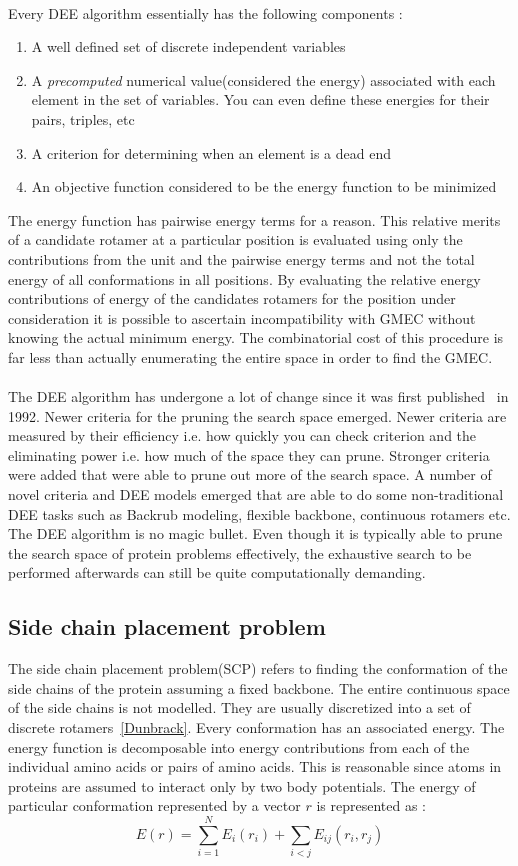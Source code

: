\documentclass{article}
\begin{document}
\\
Every DEE algorithm essentially has the following components :
\begin{enumerate}
\item A well defined set of discrete independent variables
\item A \emph{precomputed} numerical value(considered the energy) associated with each element in the set of variables. You can even define these energies for their pairs, triples, etc
\item A criterion for determining when an element is a dead end
\item An objective function considered to be the energy function to be minimized
\end{enumerate}

The energy function has pairwise energy terms for a reason. This relative merits of a candidate rotamer at a particular position is evaluated using only the contributions from the unit and the pairwise energy terms and not the total energy of all conformations in all positions. By evaluating the relative energy contributions of energy of the candidates rotamers for the position under consideration it is possible to ascertain incompatibility with GMEC without knowing the actual minimum energy. The combinatorial cost of this procedure is far less than actually enumerating the entire space in order to find the GMEC. 
\\
\\
The DEE algorithm has undergone a lot of change since it was first published~\cite{Desmet1992} in 1992. Newer criteria for the pruning the search space emerged. Newer criteria are measured by their efficiency i.e. how quickly you can check criterion and the eliminating power i.e. how much of the space they can prune. Stronger criteria were added that were able to prune out more of the search space. A number of novel criteria and DEE models emerged that are able to do some non-traditional DEE tasks such as Backrub modeling, flexible backbone, continuous rotamers etc. The DEE algorithm is no magic bullet. Even though it is typically able to prune the search space of protein problems effectively, the exhaustive search to be performed afterwards can still be quite computationally demanding.

\subsection{Side chain placement problem}
The side chain placement problem(SCP) refers to finding the conformation of the side chains of the protein assuming a fixed backbone. The entire continuous space of the side chains is not modelled. They are usually discretized into a set of discrete rotamers~\ref{Dunbrack}. Every conformation has an associated energy. The energy function is decomposable into energy contributions from each of the individual amino acids or pairs of amino acids. This is reasonable since atoms in proteins are assumed to interact only by two body potentials. The energy of particular conformation represented by a vector $r$ is represented as : 
\[
E(r) = \sum_{i=1}^{N}E_i(r_i) + \sum_{i<j}E_{ij}(r_i,r_j)
\]
\end{document}
